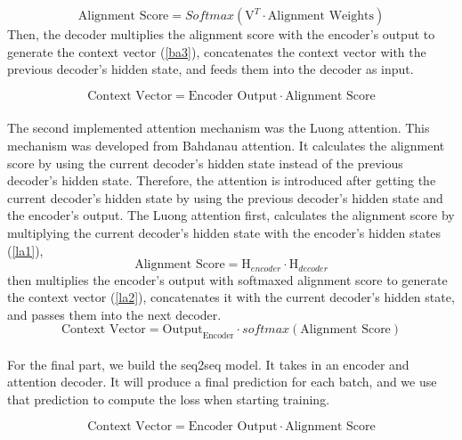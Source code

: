 \documentclass[conference]{IEEEtran}
\begin{document}
\begin{equation}
    \label{ba2}
\text{Alignment Score} = Softmax(\mathrm{V}_{}^{T} \cdot \text{Alignment Weights})
\end{equation}  
 Then, the decoder multiplies the alignment score with the encoder’s output to generate the context vector (\ref{ba3}), concatenates the context vector with the previous decoder’s hidden state, and feeds them into the decoder as input.

\begin{equation}
    \label{ba3}
\text{Context Vector} = \text{Encoder Output} \cdot \text{Alignment Score}
\end{equation}  
\\
\indent The second implemented attention mechanism was the Luong attention. This mechanism was developed from Bahdanau attention. It calculates the alignment score by using the current decoder’s hidden state instead of the previous decoder’s hidden state. Therefore, the attention is introduced after getting the current decoder’s hidden state by using the previous decoder’s hidden state and the encoder’s output. The Luong attention first, calculates the alignment score by multiplying the current decoder’s hidden state with the encoder’s hidden states (\ref{la1}),
\begin{equation}
    \label{la1}
    \text{Alignment Score} = \mathrm{H}_{encoder}^{} \cdot \mathrm{H}_{decoder}^{}
\end{equation}  
then multiplies the encoder's output with softmaxed alignment score to generate the context vector (\ref{la2}), concatenates it with the current decoder’s hidden state, and passes them into the next decoder.
\begin{equation}
    \label{la2}
    \text{Context Vector} = \mathrm{Output}_{\text{Encoder}}^{} \cdot softmax(\text{Alignment Score})
\end{equation}  
\\
\indent For the final part, we build the seq2seq model. It takes in an encoder and attention decoder. It will produce a final prediction for each batch, and we use that prediction to compute the loss when starting training. 


\begin{dmath}
    \label{ba3}
\text{Context Vector} = \text{Encoder Output} \cdot \text{Alignment Score}
\end{dmath}  
\end{document}
